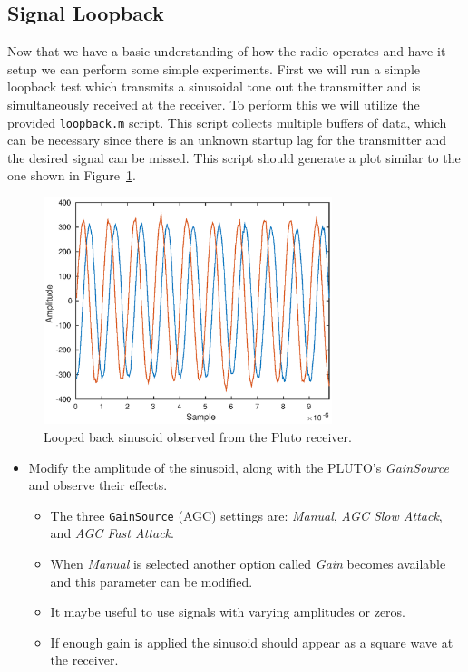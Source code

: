 \documentclass[letterpaper,12pt]{article}
\begin{document}
\subsection{Signal Loopback}
%
Now that we have a basic understanding of how the radio operates and have it setup we can perform some simple experiments.
First we will run a simple loopback test which transmits a sinusoidal tone out the transmitter and is simultaneously received at the receiver. To perform this we will utilize the provided \texttt{loopback.m} script.  This script collects multiple buffers of data, which can be necessary since there is an unknown startup lag for the transmitter and the desired signal can be missed. This script should generate a plot similar to the one shown in Figure~\ref{fig:loopback}.
%
\begin{figure}[htp!]
\centering
\includegraphics[width=0.75\textwidth]{loopback.eps}
\caption{Looped back sinusoid observed from the Pluto receiver.}\label{fig:loopback}
\end{figure}
%
%
\begin{itemize}
  \item Modify the amplitude of the sinusoid, along with the PLUTO's \textit{GainSource} and observe their effects.
\begin{itemize}
  \item The three \texttt{GainSource} (AGC) settings are: \textit{Manual}, \textit{AGC Slow Attack}, and \textit{AGC Fast Attack}.
  \item When \textit{Manual} is selected another option called \textit{Gain} becomes available and this parameter can be modified.
  \item It maybe useful to use signals with varying amplitudes or zeros.
  \item If enough gain is applied the sinusoid should appear as a square wave at the receiver.
\end{itemize}
\end{itemize}
%
\end{document}
